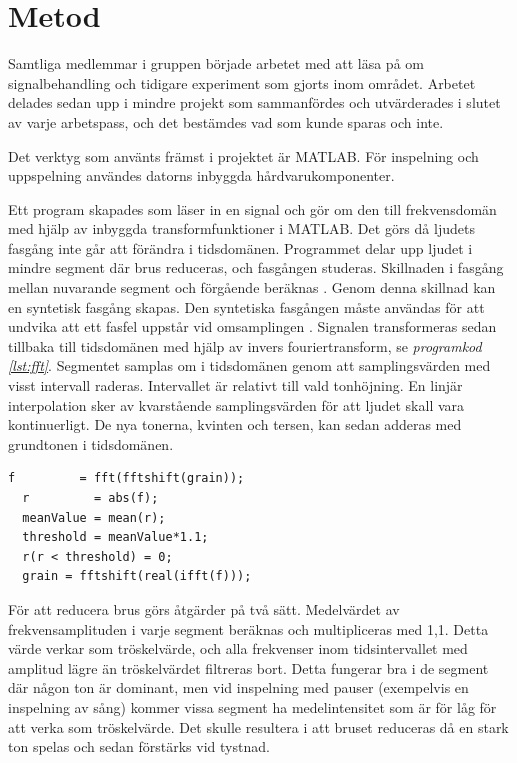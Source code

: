 \documentclass[12pt,a4paper]{article}
\begin{document}
\section{Metod}
Samtliga medlemmar i gruppen började arbetet med att läsa på om signalbehandling och tidigare experiment som gjorts inom området. Arbetet delades sedan upp i mindre projekt som sammanfördes och utvärderades i slutet av varje arbetspass, och det bestämdes vad som kunde sparas och inte.

Det verktyg som använts främst i projektet är MATLAB. För inspelning och uppspelning användes datorns inbyggda hårdvarukomponenter.

Ett program skapades som läser in en signal och gör om den till frekvensdomän med hjälp av inbyggda transformfunktioner i MATLAB. Det görs då ljudets fasgång inte går att förändra i tidsdomänen. Programmet delar upp ljudet i mindre segment där brus reduceras, och fasgången studeras. Skillnaden i fasgång mellan nuvarande segment och förgående beräknas \cite[kapitel 7.4]{bib:dafx}. Genom denna skillnad kan en syntetisk fasgång skapas. Den syntetiska fasgången måste användas för att undvika att ett fasfel uppstår vid omsamplingen \cite{bib:moinet}. Signalen transformeras sedan tillbaka till tidsdomänen med hjälp av invers fouriertransform, se \emph{programkod \ref{lst:fft}}. Segmentet samplas om i tidsdomänen genom att samplingsvärden med visst intervall raderas. Intervallet är relativt till vald tonhöjning. En linjär interpolation sker av kvarstående samplingsvärden för att ljudet skall vara kontinuerligt. De nya tonerna, kvinten och tersen, kan sedan adderas med grundtonen i tidsdomänen.

\begin{lstlisting}[caption={fouriertransform (fft) samt invers fouriertransform (ifft)},label={lst:fft}]
  f         = fft(fftshift(grain));
  r         = abs(f);
  meanValue = mean(r);
  threshold = meanValue*1.1;
  r(r < threshold) = 0;
  grain = fftshift(real(ifft(f)));
\end{lstlisting}

För att reducera brus görs åtgärder på två sätt. Medelvärdet av frekvensamplituden i varje segment beräknas och multipliceras med 1,1. Detta värde verkar som tröskelvärde, och alla frekvenser inom tidsintervallet med amplitud lägre än tröskelvärdet filtreras bort. Detta fungerar bra i de segment där någon ton är dominant, men vid inspelning med pauser (exempelvis en inspelning av sång) kommer vissa segment ha medelintensitet som är för låg för att verka som tröskelvärde. Det skulle resultera i att bruset reduceras då en stark ton spelas och sedan förstärks vid tystnad.
\end{document}

